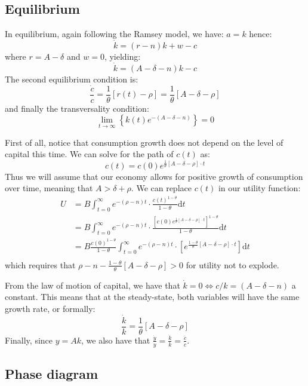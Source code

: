 \documentclass[12pt]{report}
\def\D{\mathrm{d}}
\begin{document}
\subsection{Equilibrium}

In equilibrium, again following the Ramsey model, we have: $a = k$ hence: $$\dot k = (r - n)k + w - c$$ where $r = A - \delta$ and $w=0$, yielding: $$\dot k = (A - \delta - n)k - c$$ The second equilibrium condition is: $$\frac{\dot c}{c} = \frac{1}{\theta} [r(t) - \rho]  = \frac{1}{\theta} [A - \delta - \rho]$$ and finally the transversality condition: $$ \lim_{t\to\infty}\left\lbrace k(t)e^{- (A - \delta - n)}\right\rbrace = 0 $$

First of all, notice that consumption growth does not depend on the level of capital this time. We can solve for the path of $c(t)$ as: $$c(t) = c(0) e^{\frac{1}{\theta} [A - \delta - \rho]\cdot t} $$ Thus we will assume that our economy allows for positive growth of consumption over time, meaning that $A > \delta + \rho$. We can replace $c(t)$ in our utility function: \begin{align*}
U & = B \int_{t=0}^{\infty}  e^{-(\rho - n) t} \cdot \frac{c(t)^{1-\theta}}{1 - \theta}\D t \\
& = B \int_{t=0}^{\infty}  e^{-(\rho - n) t} \cdot \frac{[c(0) e^{\frac{1}{\theta} [A - \delta - \rho]\cdot t}]^{1-\theta}}{1 - \theta}\D t \\
& = B\frac{c(0)^{1-\theta}}{1 - \theta} \int_{t=0}^{\infty}  e^{-(\rho - n) t} \cdot [ e^{\frac{1-\theta}{\theta} [A - \delta - \rho]\cdot t}]\D t \\
\end{align*} which requires that $\rho - n - \frac{1-\theta}{\theta} [A - \delta - \rho] > 0$ for utility not to explode.

From the law of motion of capital, we have that $\dot k = 0 \Leftrightarrow c/k = (A - \delta - n)$ a constant. This means that at the steady-state, both variables will have the same growth rate, or formally: $$\frac{\dot k}{k} = \frac{1}{\theta} [A - \delta - \rho] $$ Finally, since $y = Ak$, we also have that $\frac{\dot y}{y} = \frac{\dot k}{k} = \frac{\dot c}{c}$.

\subsection{Phase diagram}
\end{document}
